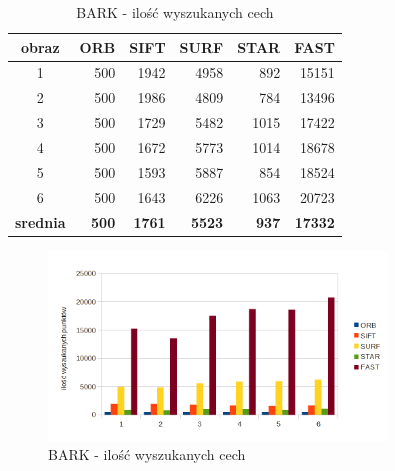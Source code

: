 \begin{table}[htbp]
  \centering
  \caption{BARK - ilość wyszukanych cech}
    \begin{tabular}{|c|r|r|r|r|r|}\hline
    
    obraz & \textbf{ORB} & \textbf{SIFT} & \textbf{SURF} & \textbf{STAR} & \textbf{FAST} \\\hline
    
    1 & 500 & 1942 & 4958 & 892 & 15151 \\
    2 & 500 & 1986 & 4809 & 784 & 13496 \\
    3 & 500 & 1729 & 5482 & 1015 & 17422 \\
    4 & 500 & 1672 & 5773 & 1014 & 18678 \\
    5 & 500 & 1593 & 5887 & 854 & 18524 \\
    6 & 500 & 1643 & 6226 & 1063 & 20723 \\\hline
    \textbf{srednia} & \textbf{500} & \textbf{1761} & \textbf{5523} & \textbf{937} & \textbf{17332} \\\hline
    
    \end{tabular}%
  \label{tab:bark_f1}%
\end{table}%


\begin{figure}
\centering
\includegraphics[width=0.8\textwidth]{pict/mikolajczyk/bark/f1.png}
\caption{BARK - ilość wyszukanych cech}
\label{fig:bark_f1}
\end{figure}


